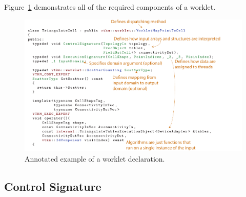 Figure~\ref{fig:WorkletExampleAnnotated} demonstrates all of the required
components of a worklet.




\begin{figure}[htb]
  \includegraphics[width=\linewidth]{images/WorkletExampleAnnotated}
  \caption{Annotated example of a worklet declaration.}
  \label{fig:WorkletExampleAnnotated}
\end{figure}

\subsection{Control Signature}
\label{sec:ControlSignature}

